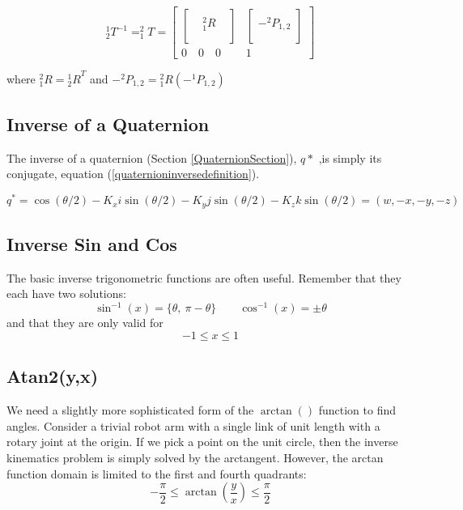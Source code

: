 \[
^1_2T^{-1} = ^2_1T =
\begin{bmatrix}
\begin{bmatrix}  &  &  \\  & ^2_1R&  \\ & & \\ \end{bmatrix}      &
 \begin{bmatrix}  \\ -^2P_{1,2} \\  \\ \end{bmatrix}            \\
 0 \quad 0 \quad 0      &   1
\end{bmatrix}
\]

where $^2_1R = {^1_2R}^T$ and $-^2P_{1,2} = {^2_1R}\left( -{^1P_{1,2}} \right )$


\subsection{Inverse of a Quaternion}

The inverse of a quaternion (Section \ref{QuaternionSection}), $q*$ ,is simply its conjugate, equation (\ref{quaternioninversedefinition}).

\[
q^* = \cos(\theta/2) - K_xi\sin(\theta/2) -K_yj\sin(\theta/2) - K_zk\sin(\theta/2) = (w,-x,-y,-z)
\]

\subsection{Inverse Sin and Cos}

The basic inverse trigonometric functions are often useful. Remember that they each have two solutions:
\[
\sin^{-1}(x) = \{\theta,\: \pi-\theta\} \qquad  \cos^{-1}(x) = \pm \theta
\]
and that they are only valid for
\[
-1 \leq x \leq 1
\]


\subsection{Atan2(y,x)}

We need a slightly more sophisticated form of the $\arctan()$ function to find angles.  Consider a trivial robot arm with a single link of unit length with a rotary joint at the origin.  If we pick a point on the unit circle, then the inverse kinematics problem is simply solved by the arctangent.  However, the arctan function domain is limited to the first and fourth quadrants:
\[
-\frac{\pi}{2} \leq \arctan(\frac{y}{x}) \leq \frac{\pi}{2}
\]

